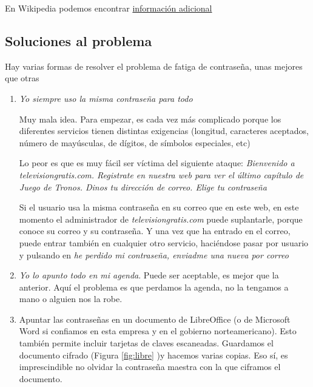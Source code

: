 \documentclass[a4paper,12pt]{article}
\begin{document}
En Wikipedia podemos encontrar
\href{https://es.wikipedia.org/wiki/Fatiga_de_contrase%C3%B1a}
{información adicional}


\subsection{Soluciones al problema}

Hay varias formas de resolver el problema de fatiga de contraseña, unas mejores que otras

    \begin{enumerate}
    \item
\emph{Yo siempre uso la misma contraseña para todo}


Muy mala idea. Para empezar, es cada vez más complicado porque los diferentes servicios
tienen distintas exigencias (longitud, caracteres aceptados, número de mayúsculas, de dígitos,
de símbolos especiales, etc)


Lo peor es que es muy fácil ser víctima del siguiente ataque:
\emph{Bienvenido a televisiongratis.com. Registrate en nuestra web para ver el último capítulo de Juego de Tronos. Dinos tu dirección de correo. Elige tu contraseña}

Si el usuario usa la misma contraseña en su correo que en este web, en este momento el administrador de \emph{televisiongratis.com} puede suplantarle,
porque conoce su correo y su contraseña. Y una vez que ha entrado en
el correo, puede entrar también en cualquier otro servicio, haciéndose pasar por usuario y pulsando en \emph{he perdido mi contraseña, enviadme una nueva por correo}

    \item
\emph{Yo lo apunto todo en mi agenda}.
Puede ser aceptable, es mejor que la anterior. Aquí el problema es que perdamos la agenda, no la tengamos a mano o alguien nos la robe.

    \item
Apuntar las contraseñas en un documento de LibreOffice (o de Microsoft Word si confiamos en esta empresa y en el gobierno norteamericano). Esto también permite incluir tarjetas
de claves escaneadas. Guardamos
el documento cifrado (Figura \ref{fig:libre} )y hacemos varias copias.
Eso sí, es imprescindible no olvidar la contraseña maestra con la que ciframos el documento.


\end{enumerate}
\end{document}
